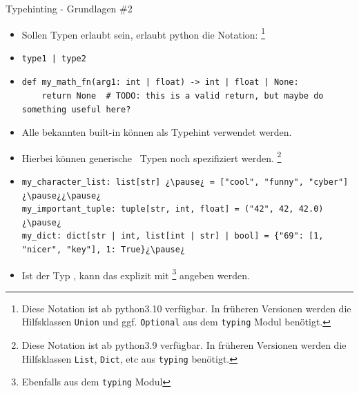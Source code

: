 \documentclass[12pt, aspectratio=169, usepdftitle=false]{beamer}
\newcommand{\pp}[1]{\lpl{#1}}
\begin{document}
\begin{frame}[fragile]{Typehinting - Grundlagen \#2}	
	\begin{itemize}
		\item Sollen  Typen erlaubt sein, erlaubt python die Notation:
		\footnote{Diese Notation ist ab python3.10 verfügbar.  In früheren Versionen werden die Hilfsklassen \texttt{Union} und ggf. \texttt{Optional} aus dem \texttt{typing} Modul benötigt.}
		
		\item[]\begin{lstlisting}[language=pytiny]
type1 | type2
		\end{lstlisting}%
		
		
		
		\pause
		
		\item[]
		\begin{lstlisting}[language=pytiny]
def my_math_fn(arg1: int | float) -> int | float | None:
    return None  # TODO: this is a valid return, but maybe do something useful here?
		\end{lstlisting}

		\pause
		
		\item Alle bekannten built-in  können als Typehint verwendet werden.
		
		\pause
		
		\item[] Hierbei können \glqq generische\grqq~ Typen noch  spezifiziert werden.
		\footnote{Diese Notation ist ab python3.9 verfügbar. In früheren Versionen werden die Hilfsklassen \texttt{List}, \texttt{Dict}, etc aus \texttt{typing} benötigt.}
		
		\item[]\begin{lstlisting}[language=pytiny]
my_character_list: list[str] ¿\pause¿ = ["cool", "funny", "cyber"]¿\pause¿¿\pause¿
my_important_tuple: tuple[str, int, float] = ("42", 42, 42.0)¿\pause¿
my_dict: dict[str | int, list[int | str] | bool] = {"69": [1, "nicer", "key"], 1: True}¿\pause¿
		\end{lstlisting}%
		
	\item Ist der Typ , kann das explizit mit \pp{Any}
	\footnote{Ebenfalls aus dem \texttt{typing} Modul} angeben werden.
	\end{itemize}
	
\end{frame}
\end{document}
